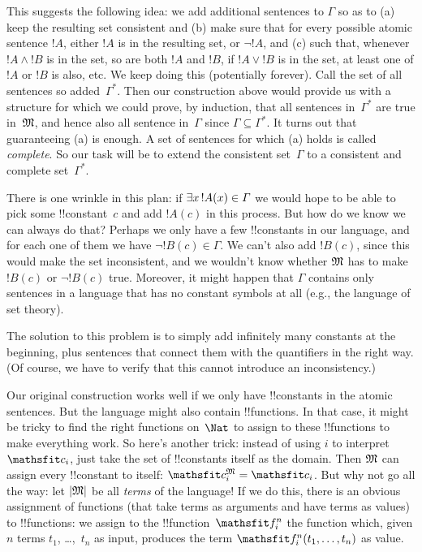 \documentclass[../../../include/open-logic-section]{subfiles}
\begin{document}
This suggests the following idea: we add additional sentences to
$\Gamma$ so as to (a) keep the resulting set consistent and (b) make
sure that for every possible atomic sentence $!A$, either $!A$ is in
the resulting set, or $\lnot !A$, and (c) such that, whenever $!A
\land !B$ is in the set, so are both $!A$ and $!B$, if $!A \lor !B$ is
in the set, at least one of $!A$ or $!B$ is also, etc.  We keep doing
this (potentially forever).  Call the set of all sentences so
added~$\Gamma^*$.  Then our construction above would provide us with a
structure for which we could prove, by induction, that all sentences
in~$\Gamma^*$ are true in~$\mathfrak M$, and hence also all sentence
in~$\Gamma$ since $\Gamma \subseteq \Gamma^*$.  It turns out that
guaranteeing (a) is enough. A set of sentences for which (a) holds is
called \emph{complete}. So our task will be to extend the consistent
set~$\Gamma$ to a consistent and complete set~$\Gamma^*$.

There is one wrinkle in this plan: if $\lexists[x][!A(x)] \in \Gamma$
we would hope to be able to pick some !!{constant}~$c$ and add $!A(c)$
in this process.  But how do we know we can always do that?  Perhaps we
only have a few !!{constant}s in our language, and for each one of
them we have $\lnot !B(c) \in \Gamma$.  We can't also add $!B(c)$,
since this would make the set inconsistent, and we wouldn't know
whether $\mathfrak M$ has to make $!B(c)$ or $\lnot !B(c)$ true.
Moreover, it might happen that $\Gamma$ contains only sentences in a
language that has no constant symbols at all (e.g., the language of
set theory).

The solution to this problem is to simply add infinitely many
constants at the beginning, plus sentences that connect them with the
quantifiers in the right way.  (Of course, we have to verify that this
cannot introduce an inconsistency.)

Our original construction works well if we only have !!{constant}s in
the atomic sentences.  But the language might also contain
!!{function}s.  In that case, it might be tricky to find the right
functions on~$\Nat$ to assign to these !!{function}s to make
everything work.  So here's another trick: instead of using $i$ to
interpret $\Obj c_i$, just take the set of !!{constant}s itself as the
domain.  Then $\mathfrak M$ can assign every !!{constant} to itself:
$\Assign{\Obj c_i}{M} = \Obj c_i$.  But why not go all the way: let
$\left| \mathfrak M \right|$ be all \emph{terms} of the language!{} If we do this,
there is an obvious assignment of functions (that take terms as
arguments and have terms as values) to !!{function}s: we assign to the
!!{function}~$\Obj f^n_i$ the function which, given $n$ terms $t_1$,
\dots,~$t_n$ as input, produces the term $\Obj f^n_i(t_1, \dots, t_n)$
as value.
\end{document}
